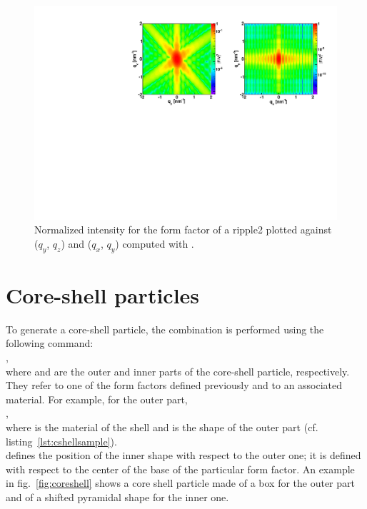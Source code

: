 \begin{figure}[ht]
\begin{center}
\includegraphics[angle=-90,width=\textwidth]{fig/ff/figffripple2.pdf}
\end{center}
\caption{Normalized intensity for the form factor of a ripple2 plotted against ($q_y$, $q_z$) and  ($q_x$, $q_y$)
  computed with .}
\label{fig:FFripple2Ex}
\end{figure}


\newpage
\section{Core-shell particles} \label{sec:CoreShell}

To generate a core-shell particle, the combination is performed using the following command:\\
,\\
where  and  are the outer and inner parts of the core-shell particle, respectively. They refer to one of the form factors defined previously and to an associated material. For example, for the outer part,\\ ,\\ where  is the material of the shell and  is the shape of the outer part (cf. listing~\ref{lst:cshellsample}). \\  defines the position of the inner shape with respect to the outer one; it is defined with respect to the center of the base of the particular form factor. An example in fig.~\ref{fig:coreshell} shows a core shell particle made of a box for the outer part and of a shifted pyramidal shape for the inner one.\\

